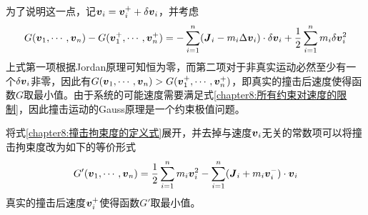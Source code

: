 为了说明这一点，记$\boldsymbol{v}_i = \boldsymbol{v}_i^++\delta\boldsymbol{v}_i$，并考虑
\begin{equation}
	G(\boldsymbol{v}_1,\cdots,\boldsymbol{v}_n)-G(\boldsymbol{v}_1^+,\cdots,\boldsymbol{v}_n^+) = -\sum_{i=1}^n (\boldsymbol{J}_i-m_i\Delta\boldsymbol{v}_i)\cdot \delta\boldsymbol{v}_i + \frac12\sum_{i=1}^n m_i\delta\boldsymbol{v}_i^2
\end{equation}
上式第一项根据Jordan原理可知恒为零，而第二项对于非真实运动必然至少有一个$\delta\boldsymbol{v}_i$非零，因此有$G(\boldsymbol{v}_1,\cdots,\boldsymbol{v}_n)>G(\boldsymbol{v}_1^+,\cdots,\boldsymbol{v}_n^+)$，即真实的撞击后速度使得函数$G$取最小值。由于系统的可能速度需要满足式\eqref{chapter8:所有约束对速度的限制}，因此撞击运动的Gauss原理是一个约束极值问题。

将式\eqref{chapter8:撞击拘束度的定义式}展开，并去掉与速度$\boldsymbol{v}_i$无关的常数项可以将撞击拘束度改为如下的等价形式
\begin{equation}
	G'(\boldsymbol{v}_1,\cdots,\boldsymbol{v}_n) = \frac12 \sum_{i=1}^n m_i\boldsymbol{v}_i^2 - \sum_{i=1}^n (\boldsymbol{J}_i+m_i\boldsymbol{v}_i^-)\cdot \boldsymbol{v}_i
	\label{chapter8:撞击拘束度的等价形式}
\end{equation}
真实的撞击后速度$\boldsymbol{v}_i^+$使得函数$G'$取最小值。

